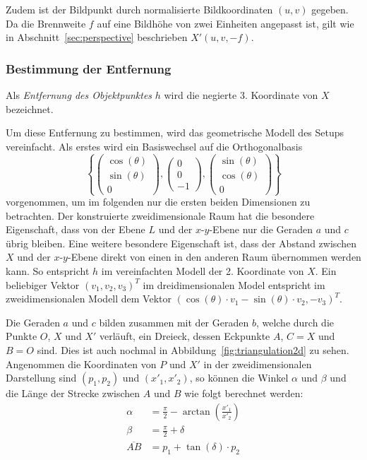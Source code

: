 \documentclass[ngerman,a4paper,parskip=half]{scrartcl}
\begin{document}
Zudem ist der Bildpunkt durch normalisierte Bildkoordinaten $(u, v)$ gegeben. Da die Brennweite $f$ auf eine Bildhöhe von zwei Einheiten angepasst ist, gilt wie in Abschnitt~\ref{sec:perspective} beschrieben $X'(u, v, -f)$.

\subsubsection{Bestimmung der Entfernung}

Als \emph{Entfernung des Objektpunktes} $h$ wird die negierte 3. Koordinate von $X$ bezeichnet.

Um diese Entfernung zu bestimmen, wird das geometrische Modell des Setups vereinfacht. Als erstes wird ein Basiswechsel auf die Orthogonalbasis
\[ \left\lbrace \begin{pmatrix}
\cos(\theta) \\ \sin(\theta) \\ 0
\end{pmatrix}, \begin{pmatrix}
0 \\ 0 \\ -1
\end{pmatrix}, \begin{pmatrix}
\sin(\theta) \\ \cos(\theta) \\ 0
\end{pmatrix} \right\rbrace \]
vorgenommen, um im folgenden nur die ersten beiden Dimensionen zu betrachten. Der konstruierte zweidimensionale Raum hat die besondere Eigenschaft, dass von der Ebene $L$ und der $x$-$y$-Ebene nur die Geraden $a$ und $c$ übrig bleiben. Eine weitere besondere Eigenschaft ist, dass der Abstand zwischen $X$ und der $x$-$y$-Ebene direkt von einen in den anderen Raum übernommen werden kann. So entspricht $h$ im vereinfachten Modell der 2. Koordinate von $X$. Ein beliebiger Vektor $(v_1, v_2, v_3)^T$ im dreidimensionalen Model entspricht im zweidimensionalen Modell dem Vektor $(\cos(\theta) \cdot v_1 - \sin(\theta) \cdot v_2, -v_3)^T$.

Die Geraden $a$ und $c$ bilden zusammen mit der Geraden $b$, welche durch die Punkte $O$, $X$ und $X'$ verläuft, ein Dreieck, dessen Eckpunkte $A$, $C = X$ und $B = O$ sind. Dies ist auch nochmal in Abbildung~\ref{fig:triangulation2d} zu sehen. Angenommen die Koordinaten von $P$ und $X'$ in der zweidimensionalen Darstellung sind $(p_1,p_2)$ und $(x'_1, x'_2)$, so können die Winkel $\alpha$ und $\beta$ und die Länge der Strecke zwischen $A$ und $B$ wie folgt berechnet werden:
\begin{align*}
	\alpha &= \frac{\pi}{2} - \arctan\left(\frac{x'_1}{x'_2}\right)\\
	\beta &= \frac{\pi}{2} + \delta\\
	\overline{AB} &= p_1 + \tan(\delta) \cdot p_2
\end{align*}
\end{document}
